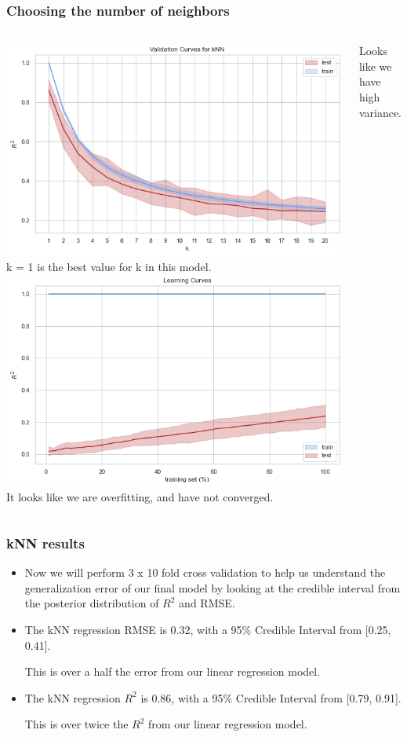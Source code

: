 \documentclass{beamer}
\begin{document}
	\begin{frame}
		\frametitle{Choosing the number of neighbors}
				\begin{columns}
			\includegraphics[width=1.\textwidth]{images/kNN validation.png}
			k = 1 is the best value for k in this model.
			\includegraphics[width=1.\textwidth]{images/kNN learning.png}
			It looks like we are overfitting, and have not converged.  \par
			Looks like we have high variance. 
			\end{columns}
	\end{frame}

	\begin{frame}
		\frametitle{kNN results}
		\begin{itemize}
		\item Now we will perform 3 x 10 fold cross validation to help us understand the generalization error of our final model by looking at the credible interval from the posterior distribution of $R^2$ and RMSE.  \par
		\item The kNN regression RMSE is 0.32, with a 95\% Credible Interval from [0.25, 0.41].  \par
		This is over a half the error from our linear regression model.  \par
		\item The kNN regression $R^2$ is 0.86, with a 95\% Credible Interval from [0.79, 0.91].  \par 
		This is over twice the $R^2$ from our linear regression model.  
	\end{itemize}
	\end{frame}
	
\end{document}
